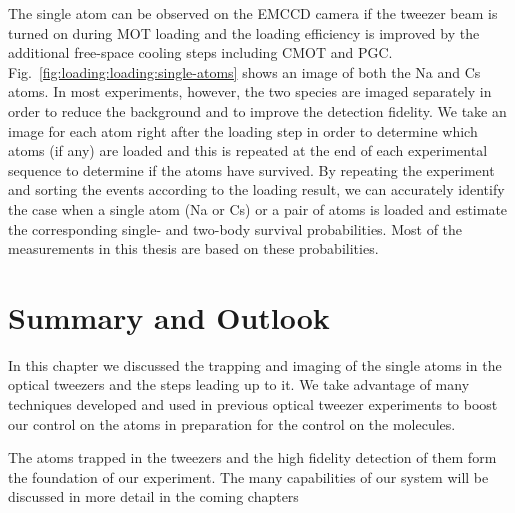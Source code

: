 The single atom can be observed on the EMCCD camera if the tweezer beam
is turned on during MOT loading and the loading efficiency is improved
by the additional free-space cooling steps including CMOT and PGC.
Fig.~\ref{fig:loading:loading:single-atoms} shows an image of both the Na and Cs atoms.
In most experiments, however, the two species are imaged separately
in order to reduce the background and to improve the detection fidelity.
We take an image for each atom right after the loading step in order to determine
which atoms (if any) are loaded and this is repeated at the end of each experimental sequence
to determine if the atoms have survived.
By repeating the experiment and sorting the events according to the loading result,
we can accurately identify the case when a single atom (Na or Cs) or a pair of atoms is loaded
and estimate the corresponding single- and two-body survival probabilities.
Most of the measurements in this thesis are based on these probabilities.

\section{Summary and Outlook}
\label{ch:loading:summary}

In this chapter we discussed the trapping and imaging of the single atoms in the optical
tweezers and the steps leading up to it.
We take advantage of many techniques developed and used in previous optical tweezer experiments
to boost our control on the atoms in preparation for the control on the molecules.

The atoms trapped in the tweezers and the high fidelity detection of them
form the foundation of our experiment.
The many capabilities of our system will be discussed in more detail in the coming chapters
